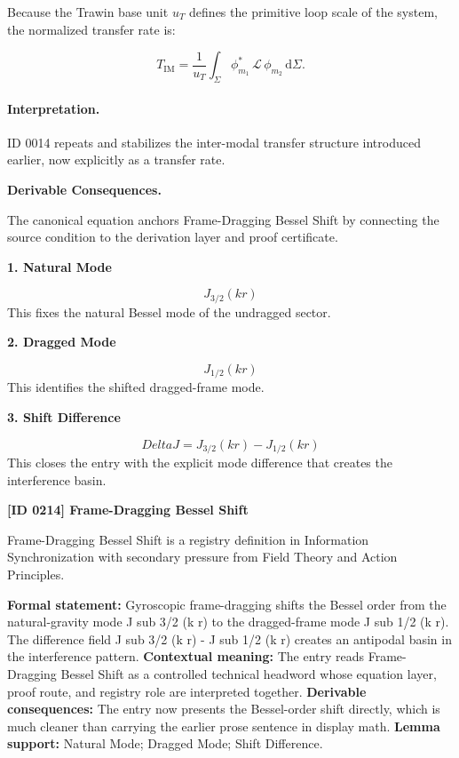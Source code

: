 Because the Trawin base unit $u_T$ defines the primitive loop scale of the system, the normalized transfer rate is:

\begin{equation}
\boxed{
T_{\mathrm{IM}}
=
\frac{1}{u_T}
\int_{\Sigma}
\phi_{m_1}^{*}
\,\mathcal{L}\,
\phi_{m_2}
\,\mathrm{d}\Sigma .
}
\end{equation}

\paragraph{Interpretation.}
ID 0014 repeats and stabilizes the inter-modal transfer structure introduced earlier, now explicitly as a transfer rate.

\par\vspace{0.35em}
\noindent\textbf{Derivable Consequences.}\quad
\begingroup
\footnotesize
\raggedright
The canonical equation anchors Frame-Dragging Bessel Shift by connecting the source condition to the derivation layer and proof certificate.
\par\endgroup

\noindent\textbf{1. Natural Mode}\par
\[
J_{3/2}(kr)
\]
\noindent This fixes the natural Bessel mode of the undragged sector.\par
\noindent\textbf{2. Dragged Mode}\par
\[
J_{1/2}(kr)
\]
\noindent This identifies the shifted dragged-frame mode.\par
\noindent\textbf{3. Shift Difference}\par
\[
Delta J = J_{3/2}(kr) - J_{1/2}(kr)
\]
\noindent This closes the entry with the explicit mode difference that creates the interference basin.\par

\clearpage
\noindent\textbf{[ID 0214] Frame-Dragging Bessel Shift}\par
\vspace{0.35em}
\begingroup\small
{}
Frame-Dragging Bessel Shift is a registry definition in Information Synchronization with secondary pressure from Field Theory and Action Principles.

\begingroup\footnotesize\setlength{\emergencystretch}{3em}\sloppy
\textbf{Formal statement:} Gyroscopic frame-dragging shifts the Bessel order from the natural-gravity mode J sub 3/2 (k r) to the dragged-frame mode J sub 1/2 (k r). The difference field J sub 3/2 (k r) - J sub 1/2 (k r) creates an antipodal basin in the interference pattern. \textbf{Contextual meaning:} The entry reads Frame-Dragging Bessel Shift as a controlled technical headword whose equation layer, proof route, and registry role are interpreted together. \textbf{Derivable consequences:} The entry now presents the Bessel-order shift directly, which is much cleaner than carrying the earlier prose sentence in display math. \textbf{Lemma support:} Natural Mode; Dragged Mode; Shift Difference.\par
\endgroup

